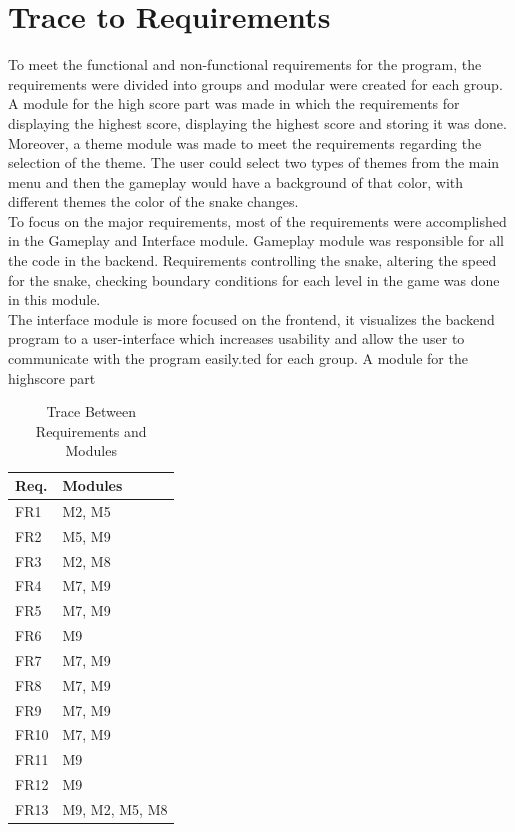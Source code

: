 \documentclass[12pt, titlepage]{article}
\begin{document}
\section{Trace to Requirements}
To meet the functional and non-functional requirements for the program, the requirements were divided into groups and modular
were created for each group. A module for the high score part was made in which the requirements for displaying the highest score, displaying the highest score and storing it was done.\\
Moreover, a theme module was made to meet the requirements regarding the selection of the theme. The user could select two types of themes from the main menu and then the gameplay would have a background of that color, with different themes the color of the snake changes.\\
To focus on the major requirements, most of the requirements were accomplished in the Gameplay and Interface module. Gameplay module was responsible for all the code in the backend. Requirements controlling the snake, altering the speed for the snake, checking boundary conditions for each level in the game was done in this module.\\
The interface module is more focused on the frontend, it visualizes the backend program to a user-interface which increases usability and allow the user to communicate with the program easily.ted for each group. A module for the highscore part

\begin{table}[H]
\centering
\begin{tabular}{p{} p{}}
\toprule
\textbf{Req.} & \textbf{Modules}\\
\midrule
FR1 & M2, M5\\
FR2 & M5, M9\\
FR3 & M2, M8\\
FR4 & M7, M9\\
FR5 & M7, M9\\
FR6 & M9\\
FR7 & M7, M9\\
FR8 & M7, M9\\
FR9 & M7, M9\\
FR10 & M7, M9\\
FR11 & M9\\
FR12 & M9\\
FR13 & M9, M2, M5, M8\\

\bottomrule
\end{tabular}
\caption{Trace Between Requirements and Modules}
\label{TblRT}
\end{table}
\end{document}
